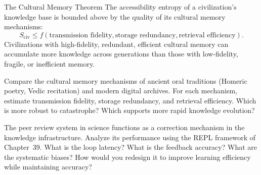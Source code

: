 \begin{namedthm}{The Cultural Memory Theorem}
  The accessibility entropy of a civilization's knowledge base is
  bounded above by the quality of its cultural memory mechanisms:
  \[
    S_\text{civ} \leq f(\text{transmission fidelity},
    \text{storage redundancy}, \text{retrieval efficiency}).
  \]
  Civilizations with high-fidelity, redundant, efficient cultural
  memory can accumulate more knowledge across generations than those
  with low-fidelity, fragile, or inefficient memory.
\end{namedthm}

\begin{exercise}
  Compare the cultural memory mechanisms of ancient oral traditions
  (Homeric poetry, Vedic recitation) and modern digital archives.
  For each mechanism, estimate transmission fidelity, storage
  redundancy, and retrieval efficiency. Which is more robust to
  catastrophe? Which supports more rapid knowledge evolution?
\end{exercise}

\begin{exercise}
  The peer review system in science functions as a correction mechanism
  in the knowledge infrastructure. Analyze its performance using the
  REPL framework of Chapter~39. What is the loop latency? What is the
  feedback accuracy? What are the systematic biases? How would you
  redesign it to improve learning efficiency while maintaining accuracy?
\end{exercise}
